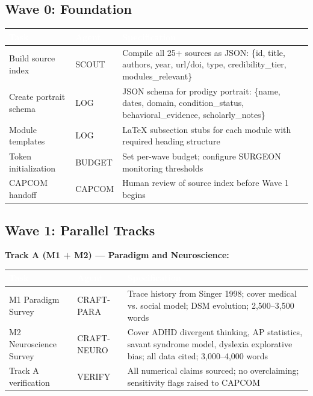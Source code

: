 \documentclass[11pt,letterpaper]{article}
\newcommand{\tableheader}[1]{\textbf{\sffamily\textcolor{white}{#1}}}
\begin{document}
\subsection{Wave 0: Foundation}

\begin{center}
\begin{tabularx}{\textwidth}{L{3cm}L{2cm}X}
\toprule
{}
\tableheader{Task} & \tableheader{Agent} & \tableheader{Specification} \\
\midrule
Build source index & SCOUT & Compile all 25+ sources as JSON: \{id, title, authors, year, url/doi, type, credibility\_tier, modules\_relevant\} \\
Create portrait schema & LOG & JSON schema for prodigy portrait: \{name, dates, domain, condition\_status, behavioral\_evidence, scholarly\_notes\} \\
Module templates & LOG & LaTeX subsection stubs for each module with required heading structure \\
Token initialization & BUDGET & Set per-wave budget; configure SURGEON monitoring thresholds \\
CAPCOM handoff & CAPCOM & Human review of source index before Wave 1 begins \\
\bottomrule
\end{tabularx}
\end{center}

\subsection{Wave 1: Parallel Tracks}

\textbf{Track A (M1 + M2) --- Paradigm and Neuroscience:}

\begin{center}
\begin{tabularx}{\textwidth}{L{3cm}L{2cm}X}
\toprule
{}
\tableheader{Task} & \tableheader{Agent} & \tableheader{Specification} \\
\midrule
M1 Paradigm Survey & CRAFT-PARA & Trace history from Singer 1998; cover medical vs. social model; DSM evolution; 2,500--3,500 words \\
M2 Neuroscience Survey & CRAFT-NEURO & Cover ADHD divergent thinking, AP statistics, savant syndrome model, dyslexia explorative bias; all data cited; 3,000--4,000 words \\
Track A verification & VERIFY & All numerical claims sourced; no overclaiming; sensitivity flags raised to CAPCOM \\
\bottomrule
\end{tabularx}
\end{center}
\end{document}
